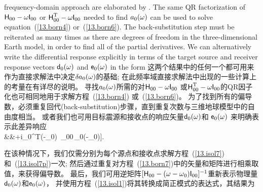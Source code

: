 {{{{frequency-domain approach are elaborated by \textcite{geller&hara93}.
The same QR factorization of $\mbox{${\sf H}$}_{00}-\mbox{$\omega$}\mbox{${\sf I}$}_{00}$
or $\mbox{${\sf H}$}_{00}^{\rm T}-\mbox{$\omega$}\mbox{${\sf I}$}_{00}$ needed to find
$a_0(\mbox{$\omega$})$ can be used to solve equation~(\ref{13.born4})
or~(\ref{13.born6}).  The back-substitution step must be
reiterated as many times as there are degrees of freedom
in the three-dimensional Earth model, in order to find all
of the partial derivatives.  We can alternatively write the
differential response explicitly in terms of the target source
and receiver response vectors $\mbox{${\sf d}$}_0(\mbox{$\omega$})$
and $\mbox{${\sf e}$}_0(\mbox{$\omega$})$ in the form
\fi
这两个结果中的任何一个都可用来作为直接求解法中决定$\delta\hspace{-0.1 mm}a_0(\mbox{$\omega$})$的基础;
在此频率域直接求解法中出现的一些计算上的考量在\textcite{geller&hara93}有详尽的说明。
寻找$a_0(\mbox{$\omega$})$所需的对$\mbox{${\sf H}$}_{00}-\mbox{$\omega$}\mbox{${\sf I}$}_{00}$
或$\mbox{${\sf H}$}_{00}^{\rm T}-\mbox{$\omega$}\mbox{${\sf I}$}_{00}$的QR因子化也可相同地用于求解方程~(\ref{13.born4})
或~(\ref{13.born6})。
为了找到所有的偏导数，必须重复回代(back-substitution)步骤，直到重复次数与三维地球模型中的自由度相当。
或者我们也可用目标震源和接收点的响应矢量$\mbox{${\sf d}$}_0(\mbox{$\omega$})$和 $\mbox{${\sf e}$}_0(\mbox{$\omega$})$
来明确表示此差异响应
\eqa \label{13.born7} \lefteqn{
\delta\hspace{-0.1 mm}a_0(\om)=\half
[\ssdelta\ssu_0^{\rm T}\,\ssd_0(\om-\om_0)+\sse_0^{\rm T}
(\om-\om_0)\,\ssdelta\ssv_0} \nonumber \\
&&\mbox{}+i\sse_0^{\rm T}(\om-\om_0)\,
\ssdelta\ssH_{00}\,\ssd_0(\om-\om_0)].
\ena

在该种情况下，我们仅需分别为每个源点和接收点求解方程~(\ref{13.isol7})和~(\ref{13.isol7p})一次;
然后通过重复对方程~(\ref{13.born7})中的矢量和矩阵进行相乘取值，来获得偏导数。
最后，我们可用逆矩阵$[\mbox{${\sf H}$}_{00}-(\mbox{$\omega$}-\mbox{$\omega$}_0)\mbox{${\sf I}$}_{00}]^{-1}$重新表示物理量$\mbox{${\sf d}$}_0(\mbox{$\omega$})$和$\mbox{${\sf e}$}_0(\mbox{$\omega$})$，
并使用方程~(\ref{13.isol1})将其转换成简正模式的表达式，其结果为
\eqa \label{13.born8}  \\
}}}}

